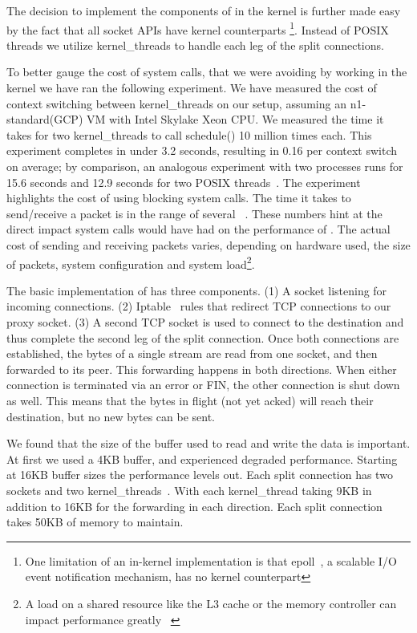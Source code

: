 The decision to implement the components of \oursys in the kernel is further made easy by the fact that all socket APIs have kernel counterparts \footnote{One limitation of an in-kernel implementation is that epoll~\cite{epoll}, a scalable I/O event notification mechanism, has no kernel counterpart}. Instead of POSIX threads we utilize kernel\_threads to handle each leg of the split connections. 


To better gauge the cost of system calls, that we were avoiding by working in the kernel we have ran the following experiment. We have measured the cost of context switching between kernel\_threads on our setup, assuming an n1-standard(GCP) VM with Intel Skylake Xeon CPU. We measured the time it takes for two kernel\_threads to call schedule() 10 million times each. This experiment completes in under 3.2 seconds, resulting in 0.16 \usec per context switch on average; by comparison, an analogous experiment with two processes runs for 15.6 seconds and 12.9 seconds for two POSIX threads~\cite{pthreads}. The experiment highlights the cost of using blocking system calls. The time it takes to send/receive a packet is in the range of several \usec ~\cite{Copy}. These numbers hint at the direct impact system calls would have had on the performance of \oursys. The actual cost of sending and receiving packets varies, depending on hardware used, the size of packets, system configuration and system load\footnote{A load on a shared resource like the L3 cache or the memory controller can impact performance greatly ~\cite{Damn}}. 


 The basic implementation of \oursys has three components. (1) A socket listening for incoming connections. (2) Iptable~\cite{iptables} rules that redirect TCP connections to our proxy socket. (3) A second TCP socket is used to connect to the destination and thus complete the second leg of the split connection. Once both connections are established, the bytes of a single stream are read from one socket, and then forwarded to its peer. This forwarding happens in both directions. When either connection is terminated via an error or FIN, the other connection is shut down as well. This means that the bytes in flight (\ie not yet acked) will reach their destination, but no new bytes can be sent.

 We found that the size of the buffer used to read and write the data is important. At first we used  a 4KB buffer, and experienced degraded performance. Starting at 16KB buffer sizes the performance levels out. Each split connection has two sockets and two kernel\_threads~\cite{kthread}. With  each kernel\_thread taking 9KB in addition to 16KB for the forwarding in each direction. Each split connection takes 50KB of memory to maintain.

